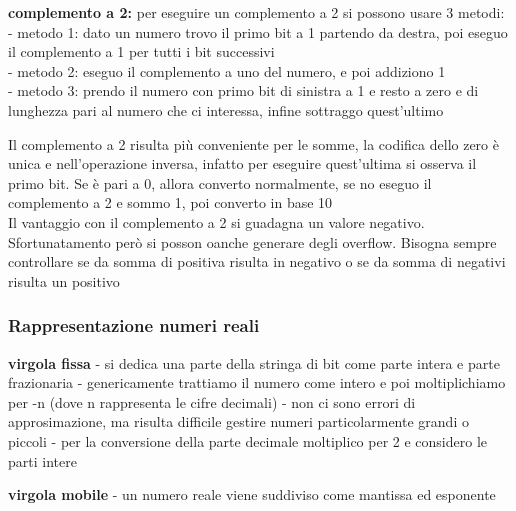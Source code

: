 \documentclass[12pt, a4paper]{article}
\begin{document}
\textbf{complemento a 2:}
per eseguire un complemento a 2 si possono usare 3 metodi:
\\ - metodo 1: dato un numero trovo il primo bit a 1 partendo da destra, poi eseguo il complemento a 1 per tutti i bit successivi
\\ - metodo 2: eseguo il complemento a uno del numero, e poi addiziono 1
\\ - metodo 3: prendo il numero con primo bit di sinistra a 1 e resto a zero e di lunghezza pari al numero che ci interessa, infine sottraggo quest'ultimo

Il complemento a 2 risulta più conveniente per le somme, la codifica dello zero è unica e nell'operazione inversa, infatto per eseguire quest'ultima
si osserva il primo bit. Se è pari a 0, allora converto normalmente, se no eseguo il complemento a 2 e sommo 1, poi converto in base 10
\\Il vantaggio con il complemento a 2 si guadagna un valore negativo. Sfortunatamento però si posson oanche generare degli overflow.
Bisogna sempre controllare se da somma di positiva risulta in negativo o se da somma di negativi risulta un positivo
 


\subsubsection{Rappresentazione numeri reali}
\textbf{virgola fissa}
  - si dedica una parte della stringa di bit come parte intera e parte frazionaria
  - genericamente trattiamo il numero come intero e poi moltiplichiamo per -n (dove n rappresenta le cifre decimali)
  - non ci sono errori di approsimazione, ma risulta difficile gestire numeri particolarmente grandi o piccoli
  - per la conversione della parte decimale moltiplico per 2 e considero le parti intere

\textbf{virgola mobile}
  - un numero reale viene suddiviso come mantissa ed esponente
\end{document}
